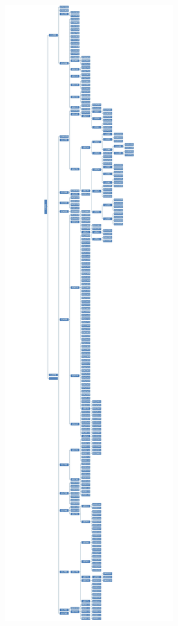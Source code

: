 \documentclass[12pt,a4paper,oneside]{book}
\begin{document}
\newpage
\begin{figure}[H]
    \centering
    \includegraphics[scale=0.1]{Images/tree.jpg}
    \caption{ }
    \label{ }
\end{figure}
\end{document}
